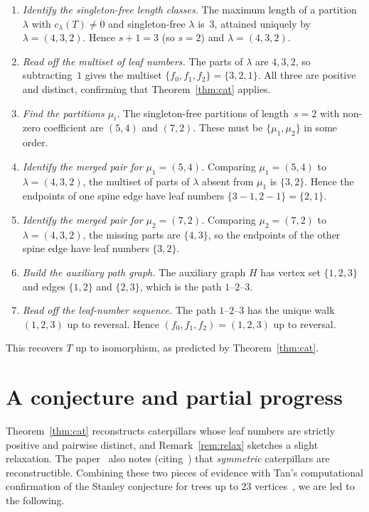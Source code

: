 \documentclass[11pt]{article}
\theoremstyle{definition}
\begin{document}
\begin{enumerate}[label=Step \arabic*., leftmargin=*]
   \item \emph{Identify the singleton-free length classes.}
         The maximum length of a partition $\lambda$ with
         $c_\lambda(T)\neq 0$ and singleton-free $\lambda$ is~$3$,
         attained uniquely by $\lambda = (4,3,2)$.  Hence $s+1=3$
         (so $s=2$) and $\lambda = (4,3,2)$.
   \item \emph{Read off the multiset of leaf numbers.}
         The parts of $\lambda$ are $4,3,2$, so subtracting~$1$ gives
         the multiset $\{f_0,f_1,f_2\} = \{3,2,1\}$.  All three are
         positive and distinct, confirming that
         Theorem~\ref{thm:cat} applies.
   \item \emph{Find the partitions $\mu_i$.}
         The singleton-free partitions of length~$s=2$ with non-zero
         coefficient are $(5,4)$ and $(7,2)$.  These must be
         $\{\mu_1,\mu_2\}$ in some order.
   \item \emph{Identify the merged pair for $\mu_1=(5,4)$.}
         Comparing $\mu_1=(5,4)$ to $\lambda=(4,3,2)$, the multiset of
         parts of $\lambda$ absent from $\mu_1$ is $\{3,2\}$.  Hence the
         endpoints of one spine edge have leaf numbers $\{3-1,2-1\}
         = \{2,1\}$.
   \item \emph{Identify the merged pair for $\mu_2=(7,2)$.}
         Comparing $\mu_2=(7,2)$ to $\lambda=(4,3,2)$, the missing
         parts are $\{4,3\}$, so the endpoints of the other spine edge
         have leaf numbers $\{3,2\}$.
   \item \emph{Build the auxiliary path graph.}
         The auxiliary graph $H$ has vertex set $\{1,2,3\}$ and edges
         $\{1,2\}$ and $\{2,3\}$, which is the path $1$--$2$--$3$.
   \item \emph{Read off the leaf-number sequence.}
         The path $1$--$2$--$3$ has the unique walk $(1,2,3)$ up to
         reversal.  Hence $(f_0,f_1,f_2) = (1,2,3)$ up to reversal.
\end{enumerate}
This recovers $T$ up to isomorphism, as predicted by
Theorem~\ref{thm:cat}.

\section{A conjecture and partial progress}\label{sec:conjecture}

Theorem~\ref{thm:cat} reconstructs caterpillars whose leaf numbers are
strictly positive and pairwise distinct, and Remark~\ref{rem:relax}
sketches a slight relaxation.  The paper~\cite{MMW} also notes
(citing~\cite{Morin}) that \emph{symmetric} caterpillars are
reconstructible.  Combining these two pieces of evidence with Tan's
computational confirmation of the Stanley conjecture for trees up to
$23$ vertices~\cite{Tan}, we are led to the following.
\end{document}

